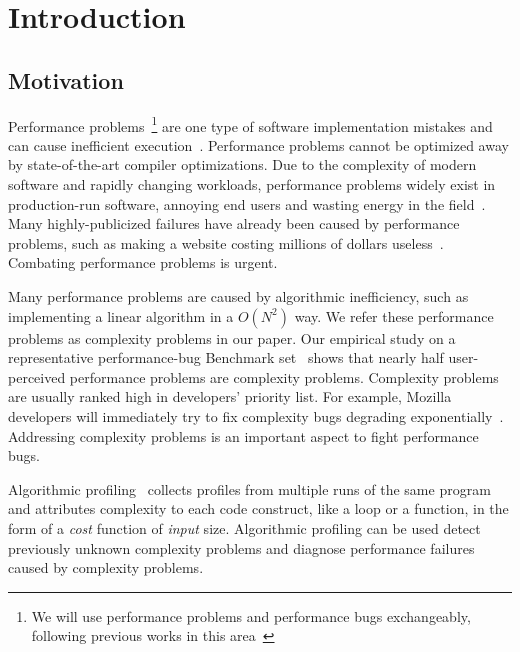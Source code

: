 \section{Introduction}
\label{sec:intro}

\subsection{Motivation}
\label{sec:motiv}

Performance problems~\footnote{We will use performance problems and performance bugs exchangeably, 
following previous works in this area~\cite{SongOOPSLA2014,ldoctor}} 
are one type of software implementation mistakes
and can cause inefficient execution~\cite{PerfBug,perf.fse10,SongOOPSLA2014,ldoctor,Alabama}. 
Performance problems cannot be optimized away by state-of-the-art compiler optimizations.
Due to the complexity of modern software and rapidly changing workloads, 
performance problems widely exist in production-run software, 
annoying end users and wasting energy in the field~\cite{PerfBug,SongOOPSLA2014,ldoctor}. 
Many highly-publicized failures have already been caused by performance problems, 
such as making a website costing millions of dollars useless~\cite{ACA-health}.
Combating performance problems is urgent. 

Many performance problems are caused by algorithmic inefficiency, 
such as implementing a linear algorithm in a $O(N^2)$ way.
We refer these performance problems as complexity problems in our paper.
Our empirical study on a representative performance-bug 
Benchmark set~\cite{PerfBug,SongOOPSLA2014} shows that 
nearly half user-perceived performance problems are complexity problems. 
Complexity problems are usually ranked high in developers' priority list. 
For example, Mozilla developers will immediately try to fix complexity bugs degrading exponentially~\cite{mozilla35294}. 
Addressing complexity problems is an important aspect to fight performance bugs. 


Algorithmic profiling~\cite{Aprof1,Aprof2,AlgoProf} collects profiles from multiple 
runs of the same program and attributes complexity to each code construct, like a loop or a function,
in the form of a \textit{cost} function of \textit{input} size. 
Algorithmic profiling can be used detect previously unknown complexity problems and 
diagnose performance failures caused by complexity problems. 


